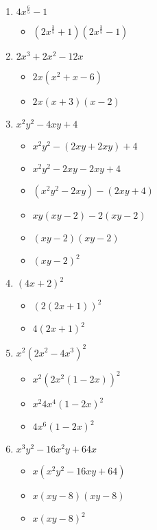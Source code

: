 \documentclass{article}
\begin{document}
\begin{onehalfspace}
\begin{enumerate}
        \item $4x^{\frac{6}{5}} - 1$
        \begin{itemize}
            \item $(2x^{\frac{3}{5}} + 1)(2x^{\frac{3}{5}} - 1)$
        \end{itemize}

        \item $2x^{3} + 2x^{2} - 12x$
        \begin{itemize}
            \item $2x(x^{2} + x - 6)$
            \item $2x(x + 3)(x - 2)$
        \end{itemize}

        \item $x^{2}y^{2} - 4xy + 4$
        \begin{itemize}
            \item $x^{2}y^{2} - (2xy + 2xy) + 4$
            \item $x^{2}y^{2} - 2xy - 2xy + 4$
            \item $(x^{2}y^{2} - 2xy) - (2xy + 4)$
            \item $xy(xy - 2) - 2(xy - 2)$
            \item $(xy - 2)(xy - 2)$
            \item $(xy - 2)^{2}$
        \end{itemize}

        \item $(4x + 2)^{2}$
        \begin{itemize}
            \item $(2(2x + 1))^{2}$
            \item $4(2x + 1)^{2}$
        \end{itemize}

        \item $x^{2}(2x^{2} - 4x^{3})^{2}$
        \begin{itemize}
            \item $x^{2}(2x^{2}(1 - 2x))^{2}$
            \item $x^{2}4x^{4}(1 - 2x)^{2}$
            \item $4x^{6}(1 - 2x)^{2}$
        \end{itemize}

        \item $x^{3}y^{2} - 16x^{2}y + 64x$
        \begin{itemize}
            \item $x(x^{2}y^{2} - 16xy + 64)$
            \item $x(xy - 8)(xy - 8)$
            \item $x(xy - 8)^{2}$
        \end{itemize}


\end{enumerate}
\end{onehalfspace}
\end{document}
